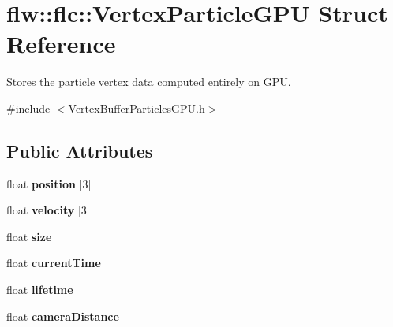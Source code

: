 \hypertarget{structflw_1_1flc_1_1VertexParticleGPU}{}\section{flw\+:\+:flc\+:\+:Vertex\+Particle\+G\+PU Struct Reference}
\label{structflw_1_1flc_1_1VertexParticleGPU}


Stores the particle vertex data computed entirely on G\+PU.  




{\ttfamily \#include $<$Vertex\+Buffer\+Particles\+G\+P\+U.\+h$>$}

\subsection*{Public Attributes}
\begin{DoxyCompactItemize}
\item 
float {\bfseries position} \mbox{[}3\mbox{]}\hypertarget{structflw_1_1flc_1_1VertexParticleGPU_a804ab5c4585472cc98ddbc26c9aad042}{}\label{structflw_1_1flc_1_1VertexParticleGPU_a804ab5c4585472cc98ddbc26c9aad042}

\item 
float {\bfseries velocity} \mbox{[}3\mbox{]}\hypertarget{structflw_1_1flc_1_1VertexParticleGPU_a543447048acf2b7a31902a1e3e908b44}{}\label{structflw_1_1flc_1_1VertexParticleGPU_a543447048acf2b7a31902a1e3e908b44}

\item 
float {\bfseries size}\hypertarget{structflw_1_1flc_1_1VertexParticleGPU_ae08d00fc512c926bc16be75a3e65ae71}{}\label{structflw_1_1flc_1_1VertexParticleGPU_ae08d00fc512c926bc16be75a3e65ae71}

\item 
float {\bfseries current\+Time}\hypertarget{structflw_1_1flc_1_1VertexParticleGPU_ad3a44fd470c89ab69d15a16952425dc5}{}\label{structflw_1_1flc_1_1VertexParticleGPU_ad3a44fd470c89ab69d15a16952425dc5}

\item 
float {\bfseries lifetime}\hypertarget{structflw_1_1flc_1_1VertexParticleGPU_a866ff7b16d6d8de7b305a5957063880f}{}\label{structflw_1_1flc_1_1VertexParticleGPU_a866ff7b16d6d8de7b305a5957063880f}

\item 
float {\bfseries camera\+Distance}\hypertarget{structflw_1_1flc_1_1VertexParticleGPU_a3a52cb5fc0a298ee40fe496164d19e57}{}\label{structflw_1_1flc_1_1VertexParticleGPU_a3a52cb5fc0a298ee40fe496164d19e57}

\end{DoxyCompactItemize}


